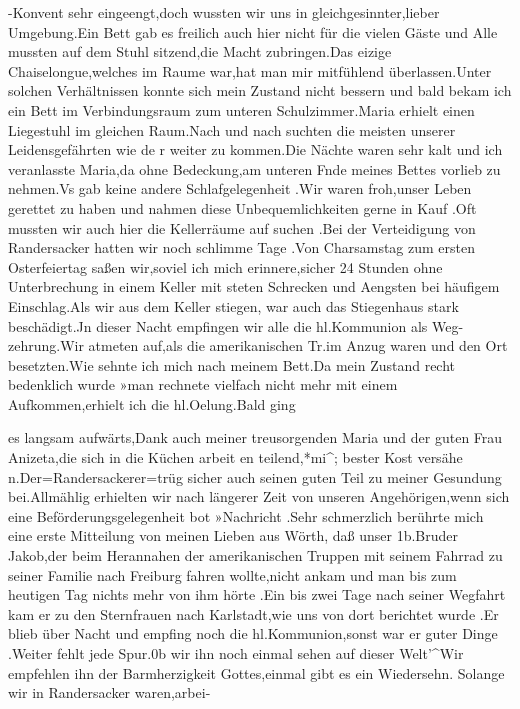 \documentclass[a4paper,11pt]{article}
\begin{document}
-Konvent sehr eingeengt,doch wussten wir uns in gleichgesinnter,lieber Umgebung.Ein Bett gab es freilich auch hier nicht für die vielen Gäste und Alle mussten auf dem Stuhl sitzend,die Macht zubringen.Das eizige Chaiselongue,welches im Raume war,hat man mir mitfühlend überlassen.Unter solchen Verhältnissen konnte sich mein Zustand nicht bessern und bald bekam ich ein Bett im Verbindungsraum zum unteren Schulzimmer.Maria erhielt einen Liegestuhl im gleichen Raum.Nach und nach suchten die meisten unserer Leidensgefährten wie de r weiter zu kommen.Die Nächte waren sehr kalt und ich veranlasste Maria,da ohne Bedeckung,am unteren Fnde meines Bettes vorlieb zu nehmen.Vs gab keine andere Schlafgelegenheit .Wir waren froh,unser Leben gerettet zu haben und nahmen diese Unbequemlichkeiten gerne in Kauf .Oft mussten wir auch hier die Kellerräume auf suchen .Bei der Verteidigung von Randersacker hatten wir noch schlimme Tage .Von Charsamstag zum ersten Osterfeiertag saßen wir,soviel ich mich erinnere,sicher 24 Stunden ohne Unterbrechung in einem Keller mit steten Schrecken und Aengsten bei häufigem Einschlag.Als wir aus dem Keller stiegen, war auch das Stiegenhaus stark beschädigt.Jn dieser Nacht empfingen wir alle die hl.Kommunion als Weg-zehrung.Wir atmeten auf,als die amerikanischen Tr.im Anzug waren und den Ort besetzten.Wie sehnte ich mich nach meinem Bett.Da mein Zustand recht bedenklich wurde »man rechnete vielfach nicht mehr mit einem Aufkommen,erhielt ich die hl.Oelung.Bald ging

 es langsam aufwärts,Dank auch meiner treusorgenden Maria und der guten Frau Anizeta,die sich in die Küchen arbeit en teilend,*mi^; bester Kost versähe n.Der=Randersackerer=trüg sicher auch seinen guten Teil zu meiner Gesundung bei.Allmählig erhielten wir nach längerer Zeit von unseren Angehörigen,wenn sich eine Beförderungsgelegenheit bot »Nachricht .Sehr schmerzlich berührte mich eine erste Mitteilung von meinen Lieben aus Wörth, daß unser 1b.Bruder Jakob,der beim Herannahen der amerikanischen Truppen mit seinem Fahrrad zu seiner Familie nach Freiburg fahren wollte,nicht ankam und man bis zum heutigen Tag nichts mehr von ihm hörte .Ein bis zwei Tage nach seiner Wegfahrt kam er zu den Sternfrauen nach Karlstadt,wie uns von dort berichtet wurde .Er blieb über Nacht und empfing noch die hl.Kommunion,sonst war er guter Dinge .Weiter fehlt jede Spur.0b wir ihn noch einmal sehen auf dieser Welt'^Wir empfehlen ihn der Barmherzigkeit Gottes,einmal gibt es ein Wiedersehn.	Solange wir in Randersacker waren,arbei-
\end{document}
